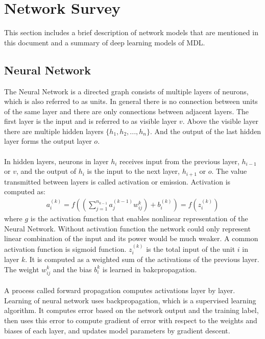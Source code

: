 \documentclass[12pt]{article}
\begin{document}
\section{Network Survey}
This section includes a brief description of network models that are mentioned in this document and a summary of deep learning models of MDL.
\subsection{Neural Network}
The Neural Network is a directed graph consists of multiple layers of neurons, which is also referred to as units. In general there is no connection between units of the same layer and there are only connections between adjacent layers. The first layer is the input and is referred to as visible layer $v$. Above the visible layer there are multiple hidden layers $\{h_1, h_2,..., h_n\}$. And the output of the last hidden layer forms the output layer $o$.\\
\\
In hidden layers, neurons in layer $h_{i}$ receives input from the previous layer,  $h_{i - 1}$ or $v$, and the output of $h_i$ is the input to the next layer, $h_{i+1}$ or $o$. The value transmitted between layers is called activation or emission. Activation is computed as:\begin{gather}
a^{(k)}_i = f((\sum_{j=1}^{n_{k-1}}a^{(k-1)}_jw^{k}_{ij})+b^{(k)}_i)=f(z^{(k)}_i)
\end{gather}
where $g$ is the activation function that enables nonlinear representation of the Neural Network. Without activation function the network could only represent linear combination of the input and its power would be much weaker. A common activation function is sigmoid function. $z^{(k)}_i$ is the total input of the unit $i$ in layer $k$. It is computed as a weighted sum of the activations of the previous layer. The weight $w^{k}_{ij}$ and the bias $b^k_i$ is learned in bakcpropagation.\\
\\
A process called forward propagation computes activations layer by layer. Learning of neural network uses backpropagation, which is a supervised learning algorithm. It computes error based on the network output and the training label, then uses this error to compute gradient of error with respect to the weights and biases of each layer, and updates model parameters by gradient descent.
\end{document}
